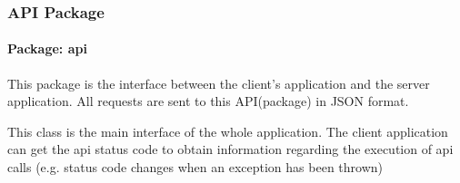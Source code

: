 \subsubsection{\label{API} API Package}
\paragraph{Package: api} This package is the interface between the client's application and the server application. 
All requests are sent to this API(package) in JSON format.


This class is the main interface of the whole application. The client application
can get the api status code to obtain information regarding the execution of api calls (e.g. status code
changes when an exception has been thrown)


